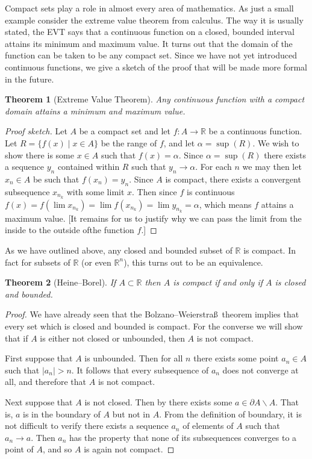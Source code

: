 \documentclass[11pt,oneside]{amsbook}
\newcommand{\R}{\mathbb R}
\renewcommand{\setminus}{\smallsetminus}
\theoremstyle{definition}
\theoremstyle{plain}
\newtheorem{thm}{Theorem}[section]
\theoremstyle{definition}
\theoremstyle{remark}
\numberwithin{equation}{section}
\numberwithin{figure}{section}
\begin{document}
Compact sets play a role in almost every area of mathematics. As just a small example consider the extreme value theorem from calculus. The way it is usually stated, the EVT says that a continuous function on a closed, bounded interval attains its minimum and maximum value. It turns out that the domain of the function can be taken to be any compact set. Since we have not yet introduced continuous functions, we give a sketch of the proof that will be made more formal in the future.

\begin{thm}[Extreme Value Theorem]
  Any continuous function with a compact domain attains a minimum and maximum value.
\end{thm}

\begin{proof}[Proof sketch]
  Let $A$ be a compact set and let $f\colon A\to\R$ be a continuous function. Let $R=\{f(x)\mid x\in A\}$ be the range of $f$, and let $\alpha=\sup(R)$. We wish to show there is some $x\in A$ such that $f(x)=\alpha$. Since $\alpha=\sup(R)$ there exists a sequence $y_n$ contained within $R$ such that $y_n\to\alpha$. For each $n$ we may then let $x_n\in A$ be such that $f(x_n)=y_n$. Since $A$ is compact, there exists a convergent subsequence $x_{n_k}$ with some limit $x$. Then since $f$ is continuous $f(x)=f(\lim x_{n_k})=\lim f(x_{n_k})=\lim y_{n_k}=\alpha$, which means $f$ attains a maximum value. [It remains for us to justify why we can pass the limit from the inside to the outside ofthe function $f$.]
\end{proof}

As we have outlined above, any closed and bounded subset of $\R$ is compact. In fact for subsets of $\R$ (or even $\R^n$), this turns out to be an equivalence.

\begin{thm}[Heine--Borel]
  If $A\subset\R$ then $A$ is compact if and only if $A$ is closed and bounded.
\end{thm}

\begin{proof}
  We have already seen that the Bolzano--Weierstra\ss\ theorem implies that every set which is closed and bounded is compact. For the converse we will show that if $A$ is either not closed or unbounded, then $A$ is not compact.

  First suppose that $A$ is unbounded. Then for all $n$ there exists some point $a_n\in A$ such that $|a_n|>n$. It follows that every subsequence of $a_n$ does not converge at all, and therefore that $A$ is not compact.

  Next suppose that $A$ is not closed. Then by there exists some $a\in\partial A\setminus A$. That is, $a$ is in the boundary of $A$ but not in $A$. From the definition of boundary, it is not difficult to verify there exists a sequence $a_n$ of elements of $A$ such that $a_n\to a$. Then $a_n$ has the property that none of its subsequences converges to a point of $A$, and so $A$ is again not compact.
\end{proof}
\end{document}
